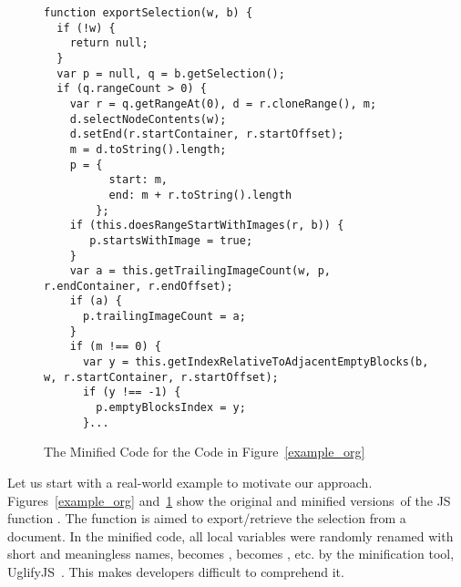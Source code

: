 \begin{figure}[t]
	\centering
	\begin{lstlisting}[]
function exportSelection(w, b) {
  if (!w) {
    return null;
  }
  var p = null, q = b.getSelection();
  if (q.rangeCount > 0) {
    var r = q.getRangeAt(0), d = r.cloneRange(), m;
    d.selectNodeContents(w);
    d.setEnd(r.startContainer, r.startOffset);
    m = d.toString().length;
    p = {
          start: m,
          end: m + r.toString().length
        };
    if (this.doesRangeStartWithImages(r, b)) {
       p.startsWithImage = true;
    }
    var a = this.getTrailingImageCount(w, p, r.endContainer, r.endOffset);
    if (a) {
      p.trailingImageCount = a;
    }
    if (m !== 0) {
      var y = this.getIndexRelativeToAdjacentEmptyBlocks(b, w, r.startContainer, r.startOffset);
      if (y !== -1) {
        p.emptyBlocksIndex = y;
      }...
\end{lstlisting}
\vspace{-12pt}
\caption{The Minified Code for the Code in Figure~\ref{example_org}}
\label{example_sim}
\end{figure}

Let us start with a real-world example to motivate our approach.
Figures~\ref{example_org} and~\ref{example_sim} show the original and
minified versions~of the JS function .  The
function is aimed to export/retrieve the selection from a document.
%
In the minified code, all local variables were randomly renamed with
short and meaningless names, \eg {} becomes ,
 becomes , etc. by the minification tool,
\eg UglifyJS~\cite{uglifyJS}. This makes developers difficult to
comprehend it.


%


%
%

